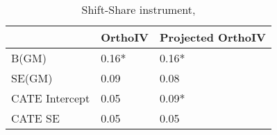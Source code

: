 \begin{table}\centering\caption{Shift-Share instrument, }\begin{tabular}{lll}
\toprule
                & OrthoIV   & Projected OrthoIV   \\
\midrule
 B(GM)          & 0.16*     & 0.16*               \\
 SE(GM)         & 0.09      & 0.08                \\
 CATE Intercept & 0.05      & 0.09*               \\
 CATE SE        & 0.05      & 0.05                \\
\bottomrule
\end{tabular}\end{table}